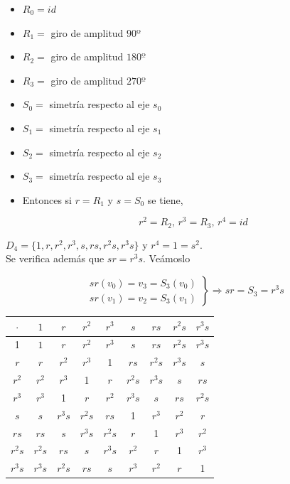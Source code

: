 \documentclass{article}
\begin{document}
\begin{itemize}
\item $R_0=id$
\item $R_1=$ giro de amplitud $90º$
\item $R_2=$ giro de amplitud $180º$
\item $R_3=$ giro de amplitud $270º$
\item $S_0=$ simetría respecto al eje $s_0$
\item $S_1=$ simetría respecto al eje $s_1$
\item $S_2=$ simetría respecto al eje $s_2$
\item $S_3=$ simetría respecto al eje $s_3$
\item Entonces si $r=R_1$ y $s=S_0$ se tiene,

\[
r^2=R_2,\, r^3=R_3,\, r^4=id
\]
\end{itemize}

$D_4=\{1,r,r^2,r^3,s,rs,r^2s,r^3s\}$ y $r^4=1=s^2$. \\

Se verifica además que $sr=r^3s$. Veámoslo

\[
\left.\begin{array}{c}
sr(v_0)=v_3=S_3(v_0) \\
sr(v_1)=v_2=S_3(v_1)
\end{array}
\right\rbrace \Rightarrow sr=S_3=r^3s
\]

\begin{center}
\begin{tabular}{c|c c c c c c c c}
$\cdot$ & $1$ & $r$ & $r^2$ & $r^3$ & $s$ & $rs$ & $r^2s$ & $r^3s$ \\
\hline
1 & $1$ & $r$ & $r^2$ & $r^3$ & $s$ & $rs$ & $r^2s$ & $r^3s$ \\
$r$ & $r$ & $r^2$ & $r^3$ & 1 & $rs$ & $r^2s$ & $r^3s$ & $s$ \\  
$r^2$ & $r^2$ & $r^3$ & 1 & $r$ & $r^2s$ & $r^3s$ & $s$ & $rs$ \\ 
$r^3$ & $r^3$ & 1 & $r$ & $r^2$ & $r^3s$ & $s$ & $rs$ & $r^2s$ \\ 
$s$ & $s$ & $r^3s$ & $r^2s$ & $rs$ & 1 & $r^3$ & $r^2$ & $r$ \\ 
$rs$ & $rs$ & $s$ & $r^3s$ & $r^2s$ & $r$ & 1 & $r^3$ & $r^2$ \\ 
$r^2s$ & $r^2s$ & $rs$ & $s$ & $r^3s$ & $r^2$ & $r$ & 1 & $r^3$ \\ 
$r^3s$ & $r^3s$ & $r^2s$ & $rs$ & $s$ & $r^3$ & $r^2$ & $r$ & 1 \\ 
\end{tabular}
\end{center}
\end{document}
